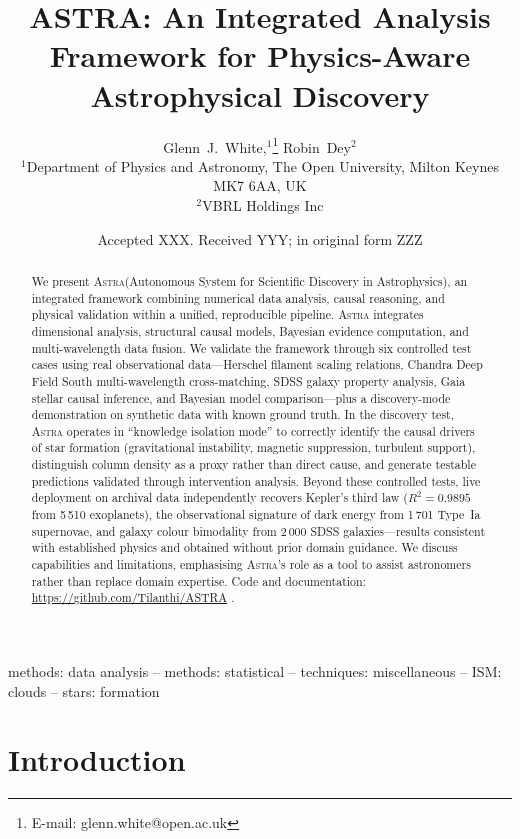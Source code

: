 \documentclass[fleqn,usenatbib]{mnras}
\title[ASTRA: Integrated Analysis Framework]{ASTRA: An Integrated Analysis Framework for Physics-Aware Astrophysical Discovery}
\author[White \& Dey]{%
Glenn~J.~White,$^{1}$\thanks{E-mail: glenn.white@open.ac.uk}
Robin~Dey$^{2}$
\\
$^{1}$Department of Physics and Astronomy, The Open University, Milton Keynes MK7 6AA, UK\\
$^{2}$VBRL Holdings Inc}
\date{Accepted XXX. Received YYY; in original form ZZZ}
\newcommand{\astra}{\textsc{Astra}\xspace}
\begin{document}
\maketitle

\begin{abstract}
We present \astra (Autonomous System for Scientific Discovery in Astrophysics), an integrated framework combining numerical data analysis, causal reasoning, and physical validation within a unified, reproducible pipeline.
\astra integrates dimensional analysis, structural causal models, Bayesian evidence computation, and multi-wavelength data fusion.
We validate the framework through six controlled test cases using real observational data---Herschel filament scaling relations, Chandra Deep Field South multi-wavelength cross-matching, SDSS galaxy property analysis, Gaia stellar causal inference, and Bayesian model comparison---plus a discovery-mode demonstration on synthetic data with known ground truth.
In the discovery test, \astra operates in ``knowledge isolation mode'' to correctly identify the causal drivers of star formation (gravitational instability, magnetic suppression, turbulent support), distinguish column density as a proxy rather than direct cause, and generate testable predictions validated through intervention analysis.
Beyond these controlled tests, live deployment on archival data independently recovers Kepler's third law ($R^{2}=0.9895$ from 5\,510 exoplanets), the observational signature of dark energy from 1\,701 Type~Ia supernovae, and galaxy colour bimodality from 2\,000 SDSS galaxies---results consistent with established physics and obtained without prior domain guidance.
We discuss capabilities and limitations, emphasising \astra's role as a tool to assist astronomers rather than replace domain expertise.
Code and documentation: \url{https://github.com/Tilanthi/ASTRA} \citep{WhiteDey2026}.
\end{abstract}

\begin{keywords}
methods: data analysis -- methods: statistical -- techniques: miscellaneous -- ISM: clouds -- stars: formation
\end{keywords}

\section{Introduction}
\label{sec:introduction}
\end{document}
